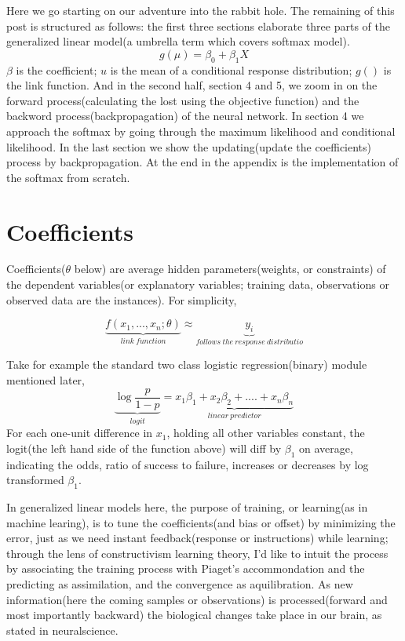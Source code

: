 \documentclass[a4paper]{article}
\begin{document}
Here we go starting on our adventure into the rabbit hole. The remaining of this post is structured as follows: the first three sections elaborate three parts of the generalized linear model(a umbrella term which covers softmax model). 
$$ 
g(\mu)=\beta_0+\beta_1X
$$
$\beta$ is the coefficient; $u$ is the mean of a conditional response distribution; $g()$ is the link function. And in the second half, section 4 and 5, we zoom in on the forward process(calculating the lost using the objective function) and the backword process(backpropagation) of the neural network. In section 4 we approach the softmax by going through the maximum likelihood and conditional likelihood. In the last section we show the updating(update the coefficients) process by backpropagation. At the end in the appendix is the implementation of the softmax from scratch. 

\section{Coefficients}
Coefficients($\theta$ below) are average hidden parameters(weights, or constraints) of the dependent variables(or explanatory variables; training data, observations or observed data are the instances). For simplicity, 

$$\underbrace{f(x_1,..., x_n; \theta)}_{link\ function} \approx \underbrace{y_i}_{follows\ the\ response\ distributio}$$      

Take for example the standard two class logistic regression(binary) module mentioned later,
$$\underbrace{\log\frac{p}{1-p}}_{logit}=\underbrace{x_1\beta_1+x_2\beta_2+....+x_n\beta_n}_{linear\ predictor}$$
For each one-unit difference in $x_1$, holding all other variables constant, the logit(the left hand side of the function above) will diff by $\beta_1$ on average, indicating the odds, ratio of success to failure, increases or decreases by log transformed $\beta_1$.

In generalized linear models here, the purpose of training, or learning(as in machine learing), is to tune the coefficients(and bias or offset) by minimizing the error, just as we need instant feedback(response or instructions) while learning; through the lens of constructivism learning theory, I'd like to intuit the process by associating the training process with Piaget's accommondation and the predicting as assimilation, and the convergence as aquilibration. As new information(here the coming samples or observations) is processed(forward and most importantly backward) the biological changes take place in our brain, as stated in neuralscience. 
\end{document}
